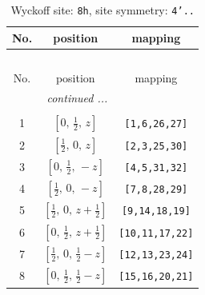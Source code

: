 \documentclass[fleqn,8pt]{jsarticle}
\begin{document}
\begin{longtable}{ccc}
\caption{Wyckoff site: {\tt 8h}, site symmetry: {\tt 4'..}}
 \\
 \hline \hline
No. & position & mapping \\ \hline \endfirsthead

\multicolumn{2}{l}{\tablename\ \thetable{}} \\
 \hline \hline
No. & position & mapping \\ \hline \endhead

 \hline \hline
\multicolumn{2}{r}{\footnotesize\it continued ...} \\ \endfoot

 \hline \hline
\multicolumn{2}{r}{} \\ \endlastfoot

1 & $\left[ 0,\, \frac{1}{2},\, z \right]$ & {\tt [1,6,26,27]} \\ \hline
2 & $\left[ \frac{1}{2},\, 0,\, z \right]$ & {\tt [2,3,25,30]} \\ \hline
3 & $\left[ 0,\, \frac{1}{2},\, - z \right]$ & {\tt [4,5,31,32]} \\ \hline
4 & $\left[ \frac{1}{2},\, 0,\, - z \right]$ & {\tt [7,8,28,29]} \\ \hline
5 & $\left[ \frac{1}{2},\, 0,\, z + \frac{1}{2} \right]$ & {\tt [9,14,18,19]} \\ \hline
6 & $\left[ 0,\, \frac{1}{2},\, z + \frac{1}{2} \right]$ & {\tt [10,11,17,22]} \\ \hline
7 & $\left[ \frac{1}{2},\, 0,\, \frac{1}{2} - z \right]$ & {\tt [12,13,23,24]} \\ \hline
8 & $\left[ 0,\, \frac{1}{2},\, \frac{1}{2} - z \right]$ & {\tt [15,16,20,21]} \\
\end{longtable}
\renewcommand{\arraystretch}{1.2}
\end{document}
